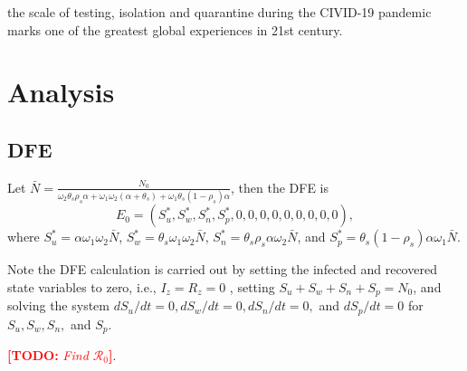\documentclass{article}
\newcommand{\Rnum}{\mathcal{R}_0}
\newcommand{\comment}{\showcomment}
\newcommand{\showcomment}[3]{\textcolor{#1}{\textbf{[#2: }\textsl{#3}\textbf{]}}}
\newcommand{\todo}[1]{\comment{red}{TODO}{#1}}
\theoremstyle{definition} %
\begin{document}
the scale of testing, isolation and quarantine during the CIVID-19 pandemic marks one of the greatest global experiences in 21st century.
\section{Analysis}

\subsection{DFE}

Let $\bar{N} =\frac{N_0}{\omega_2 \theta_s \rho_s \alpha + 
\omega_1 \omega_2 (\alpha+\theta_s) + \omega_1 \theta_s (1-\rho_s) \alpha}$, then the DFE is 
$$E_0=(S_u^*,S_w^*,S_n^*,S_p^*,0,0,0,0,0,0,0,0,0),$$ where
$S_u^*= \alpha \omega_1 \omega_2 \bar{N}$,
$S_w^*= \theta_s \omega_1 \omega_2 \bar{N}$, 
$S_n^*=\theta_s \rho_s \alpha \omega_2 \bar{N} $, and
$S_p^*= \theta_s(1-\rho_s)\alpha \omega_1 \bar{N}$.

Note the DFE calculation is carried out by setting the infected and recovered state variables to zero, i.e., $I_z=R_z=0$ , setting $S_u+S_w+S_n+S_p=N_0$, and solving the system $dS_u/dt=0, dS_w/dt=0, dS_n/dt=0,$ and $dS_p/dt=0$ for $S_u, S_w, S_n,$ and $S_p$. 

\todo{Find $\Rnum$}.
\end{document}
